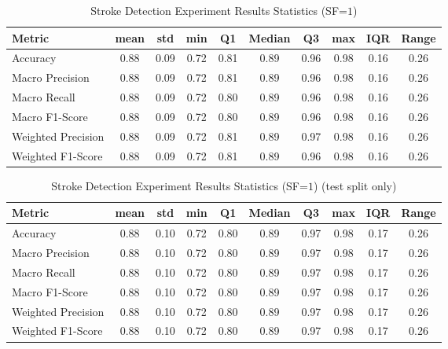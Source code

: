 \begin{table}[h]
\caption{Stroke Detection Experiment Results Statistics (SF=$1$)}
\label{tab:sf1_Stroke_Detection_Results_Statistics}
\begin{tabular}{|l|c|c|c|c|c|c|c|c|c|}
\toprule
Metric & mean & std & min & Q1 & Median & Q3 & max & IQR & Range \\
\midrule
Accuracy & 0.88 & 0.09 & 0.72 & 0.81 & 0.89 & 0.96 & 0.98 & 0.16 & 0.26 \\
Macro Precision & 0.88 & 0.09 & 0.72 & 0.81 & 0.89 & 0.96 & 0.98 & 0.16 & 0.26 \\
Macro Recall & 0.88 & 0.09 & 0.72 & 0.80 & 0.89 & 0.96 & 0.98 & 0.16 & 0.26 \\
Macro F1-Score & 0.88 & 0.09 & 0.72 & 0.80 & 0.89 & 0.96 & 0.98 & 0.16 & 0.26 \\
Weighted Precision & 0.88 & 0.09 & 0.72 & 0.81 & 0.89 & 0.97 & 0.98 & 0.16 & 0.26 \\
Weighted F1-Score & 0.88 & 0.09 & 0.72 & 0.81 & 0.89 & 0.96 & 0.98 & 0.16 & 0.26 \\
\bottomrule
\end{tabular}
\end{table}

\begin{table}[h]
\caption{Stroke Detection Experiment Results Statistics (SF=$1$) (test split only)}
\label{tab:sf1_test_Stroke_Detection_Results_Statistics}
\begin{tabular}{|l|c|c|c|c|c|c|c|c|c|}
\toprule
Metric & mean & std & min & Q1 & Median & Q3 & max & IQR & Range \\
\midrule
Accuracy & 0.88 & 0.10 & 0.72 & 0.80 & 0.89 & 0.97 & 0.98 & 0.17 & 0.26 \\
Macro Precision & 0.88 & 0.10 & 0.72 & 0.80 & 0.89 & 0.97 & 0.98 & 0.17 & 0.26 \\
Macro Recall & 0.88 & 0.10 & 0.72 & 0.80 & 0.89 & 0.97 & 0.98 & 0.17 & 0.26 \\
Macro F1-Score & 0.88 & 0.10 & 0.72 & 0.80 & 0.89 & 0.97 & 0.98 & 0.17 & 0.26 \\
Weighted Precision & 0.88 & 0.10 & 0.72 & 0.80 & 0.89 & 0.97 & 0.98 & 0.17 & 0.26 \\
Weighted F1-Score & 0.88 & 0.10 & 0.72 & 0.80 & 0.89 & 0.97 & 0.98 & 0.17 & 0.26 \\
\bottomrule
\end{tabular}
\end{table}

